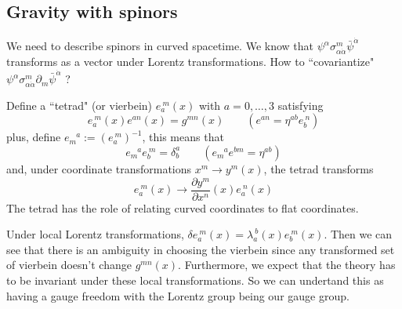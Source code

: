 \documentclass[a4paper,12pt]{article}
\numberwithin{equation}{section}
\numberwithin{exe}{section}
\newcommand{\ph}[1]{\phantom{#1}}
\newcommand{\p}{{\partial}}
\renewcommand{\a}{{\alpha}}
\newcommand{\ad}{{\dot\alpha}}
\renewcommand{\d}{{\delta}}
\renewcommand{\l}{{\lambda}}
\newcommand{\s}{{\sigma}}
\newcommand{\psib}{{\bar\psi}}
\begin{document}
\subsection{Gravity with spinors}
We need to describe spinors in curved spacetime. We know that $\psi^\a \s^m_{\a\ad} \psib^\ad$ transforms as a vector under Lorentz transformations. How to ``covariantize" $\psi^\a \s^m_{\a\ad} \p_m\psib^\ad$ ? %

Define a ``tetrad" (or vierbein) $e_a^{\ m}(x)$ with $a=0,\ldots, 3$ satisfying
	\begin{equation}
	e_a^{\ m}(x) e^{a n}(x) = g^{mn}(x)\qquad (e^{a n} = \eta^{ab} e_b^{\ n})
	\end{equation}
plus, define $e_m^{\ph{m}a}:= (e_a^{\ m})^{-1}$, this means that
	\begin{equation}
	e_m^{\ph{m} a} e_b^{\ m} = \d^a_b\qquad (e_m^{\ph{m}a} e^{bm} = \eta^{ab})
	\end{equation}
and, under coordinate transformations $x^m\rightarrow y^m(x)$, the tetrad transforms
	\begin{equation}
	e_a^{\ m}(x) \rightarrow \frac{\p y^m}{\p x^n}(x)e_a^{\ n}(x)
	\end{equation}
The tetrad has the role of relating curved coordinates to flat coordinates.

Under local Lorentz transformations, $\d e_a^{\ m}(x) = \l_a^{\ b}(x) e_b^{\ m}(x)$. Then we can see that there is an ambiguity in choosing the vierbein since any transformed set of vierbein doesn't change $g^{mn}(x)$. Furthermore, we expect that the theory has to be invariant under these local transformations. So we can undertand this as having a gauge freedom with the Lorentz group being our gauge group.
\end{document}
